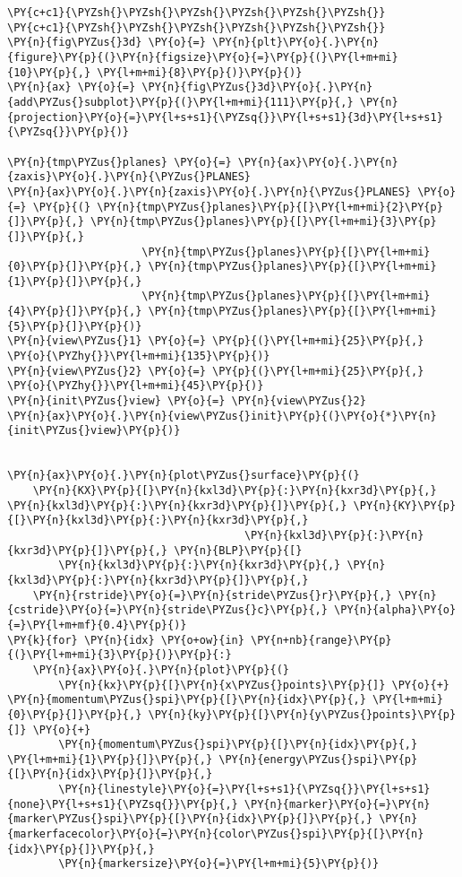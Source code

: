 \begin{Verbatim}[commandchars=\\\{\}]
\PY{c+c1}{\PYZsh{}\PYZsh{}\PYZsh{}\PYZsh{}\PYZsh{}\PYZsh{}}
\PY{c+c1}{\PYZsh{}\PYZsh{}\PYZsh{}\PYZsh{}\PYZsh{}\PYZsh{}}
\PY{n}{fig\PYZus{}3d} \PY{o}{=} \PY{n}{plt}\PY{o}{.}\PY{n}{figure}\PY{p}{(}\PY{n}{figsize}\PY{o}{=}\PY{p}{(}\PY{l+m+mi}{10}\PY{p}{,} \PY{l+m+mi}{8}\PY{p}{)}\PY{p}{)}
\PY{n}{ax} \PY{o}{=} \PY{n}{fig\PYZus{}3d}\PY{o}{.}\PY{n}{add\PYZus{}subplot}\PY{p}{(}\PY{l+m+mi}{111}\PY{p}{,} \PY{n}{projection}\PY{o}{=}\PY{l+s+s1}{\PYZsq{}}\PY{l+s+s1}{3d}\PY{l+s+s1}{\PYZsq{}}\PY{p}{)}

\PY{n}{tmp\PYZus{}planes} \PY{o}{=} \PY{n}{ax}\PY{o}{.}\PY{n}{zaxis}\PY{o}{.}\PY{n}{\PYZus{}PLANES} 
\PY{n}{ax}\PY{o}{.}\PY{n}{zaxis}\PY{o}{.}\PY{n}{\PYZus{}PLANES} \PY{o}{=} \PY{p}{(} \PY{n}{tmp\PYZus{}planes}\PY{p}{[}\PY{l+m+mi}{2}\PY{p}{]}\PY{p}{,} \PY{n}{tmp\PYZus{}planes}\PY{p}{[}\PY{l+m+mi}{3}\PY{p}{]}\PY{p}{,} 
                     \PY{n}{tmp\PYZus{}planes}\PY{p}{[}\PY{l+m+mi}{0}\PY{p}{]}\PY{p}{,} \PY{n}{tmp\PYZus{}planes}\PY{p}{[}\PY{l+m+mi}{1}\PY{p}{]}\PY{p}{,} 
                     \PY{n}{tmp\PYZus{}planes}\PY{p}{[}\PY{l+m+mi}{4}\PY{p}{]}\PY{p}{,} \PY{n}{tmp\PYZus{}planes}\PY{p}{[}\PY{l+m+mi}{5}\PY{p}{]}\PY{p}{)}
\PY{n}{view\PYZus{}1} \PY{o}{=} \PY{p}{(}\PY{l+m+mi}{25}\PY{p}{,} \PY{o}{\PYZhy{}}\PY{l+m+mi}{135}\PY{p}{)}
\PY{n}{view\PYZus{}2} \PY{o}{=} \PY{p}{(}\PY{l+m+mi}{25}\PY{p}{,} \PY{o}{\PYZhy{}}\PY{l+m+mi}{45}\PY{p}{)}
\PY{n}{init\PYZus{}view} \PY{o}{=} \PY{n}{view\PYZus{}2}
\PY{n}{ax}\PY{o}{.}\PY{n}{view\PYZus{}init}\PY{p}{(}\PY{o}{*}\PY{n}{init\PYZus{}view}\PY{p}{)}


\PY{n}{ax}\PY{o}{.}\PY{n}{plot\PYZus{}surface}\PY{p}{(}
    \PY{n}{KX}\PY{p}{[}\PY{n}{kxl3d}\PY{p}{:}\PY{n}{kxr3d}\PY{p}{,} \PY{n}{kxl3d}\PY{p}{:}\PY{n}{kxr3d}\PY{p}{]}\PY{p}{,} \PY{n}{KY}\PY{p}{[}\PY{n}{kxl3d}\PY{p}{:}\PY{n}{kxr3d}\PY{p}{,}
                                     \PY{n}{kxl3d}\PY{p}{:}\PY{n}{kxr3d}\PY{p}{]}\PY{p}{,} \PY{n}{BLP}\PY{p}{[}
        \PY{n}{kxl3d}\PY{p}{:}\PY{n}{kxr3d}\PY{p}{,} \PY{n}{kxl3d}\PY{p}{:}\PY{n}{kxr3d}\PY{p}{]}\PY{p}{,}
    \PY{n}{rstride}\PY{o}{=}\PY{n}{stride\PYZus{}r}\PY{p}{,} \PY{n}{cstride}\PY{o}{=}\PY{n}{stride\PYZus{}c}\PY{p}{,} \PY{n}{alpha}\PY{o}{=}\PY{l+m+mf}{0.4}\PY{p}{)}
\PY{k}{for} \PY{n}{idx} \PY{o+ow}{in} \PY{n+nb}{range}\PY{p}{(}\PY{l+m+mi}{3}\PY{p}{)}\PY{p}{:}
    \PY{n}{ax}\PY{o}{.}\PY{n}{plot}\PY{p}{(}
        \PY{n}{kx}\PY{p}{[}\PY{n}{x\PYZus{}points}\PY{p}{]} \PY{o}{+} \PY{n}{momentum\PYZus{}spi}\PY{p}{[}\PY{n}{idx}\PY{p}{,} \PY{l+m+mi}{0}\PY{p}{]}\PY{p}{,} \PY{n}{ky}\PY{p}{[}\PY{n}{y\PYZus{}points}\PY{p}{]} \PY{o}{+}
        \PY{n}{momentum\PYZus{}spi}\PY{p}{[}\PY{n}{idx}\PY{p}{,} \PY{l+m+mi}{1}\PY{p}{]}\PY{p}{,} \PY{n}{energy\PYZus{}spi}\PY{p}{[}\PY{n}{idx}\PY{p}{]}\PY{p}{,}
        \PY{n}{linestyle}\PY{o}{=}\PY{l+s+s1}{\PYZsq{}}\PY{l+s+s1}{none}\PY{l+s+s1}{\PYZsq{}}\PY{p}{,} \PY{n}{marker}\PY{o}{=}\PY{n}{marker\PYZus{}spi}\PY{p}{[}\PY{n}{idx}\PY{p}{]}\PY{p}{,} \PY{n}{markerfacecolor}\PY{o}{=}\PY{n}{color\PYZus{}spi}\PY{p}{[}\PY{n}{idx}\PY{p}{]}\PY{p}{,}
        \PY{n}{markersize}\PY{o}{=}\PY{l+m+mi}{5}\PY{p}{)}


\end{Verbatim}
